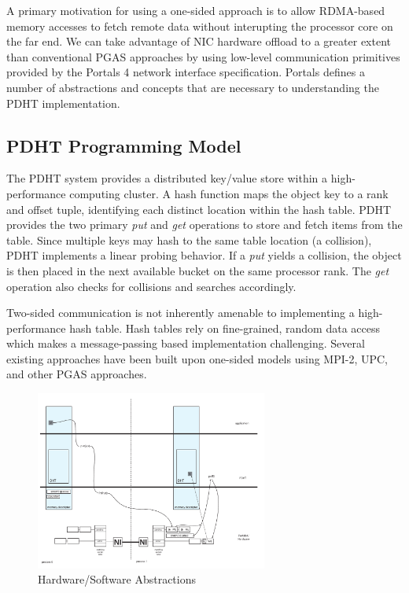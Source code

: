 A primary motivation for using a one-sided approach is to allow
RDMA-based memory accesses to fetch remote data without interupting
the processor core on the far end. We can take advantage of NIC
hardware offload to a greater extent than conventional PGAS approaches
by using low-level communication primitives provided by the Portals 4
network interface specification. Portals defines a number of
abstractions and concepts that are necessary to understanding the PDHT
implementation.


\subsection{PDHT Programming Model}


 
The PDHT system provides a distributed key/value store within a
high-performance computing cluster. A hash function maps the object
key to a rank and offset tuple, identifying each distinct location
within the hash table. PDHT provides the two primary {\em put} and
{\em get} operations to store and fetch items from the table. Since
multiple keys may hash to the same table location (a collision), PDHT
implements a linear probing behavior. If a {\em put} yields a
collision, the object is then placed in the next available bucket on
the same processor rank. The {\em get} operation also checks for
collisions and searches accordingly. 

Two-sided communication is not inherently amenable to implementing a
high-performance hash table. Hash tables rely on fine-grained, random
data access which makes a message-passing based implementation
challenging. Several existing approaches have been built upon
one-sided models using MPI-2, UPC, and other PGAS approaches.

\begin{figure}[ht]
  \centering
  \includegraphics[width=3in]{figs/hwsw}
  \caption{Hardware/Software Abstractions}
  \label{fig:hwsw}
\end{figure}

